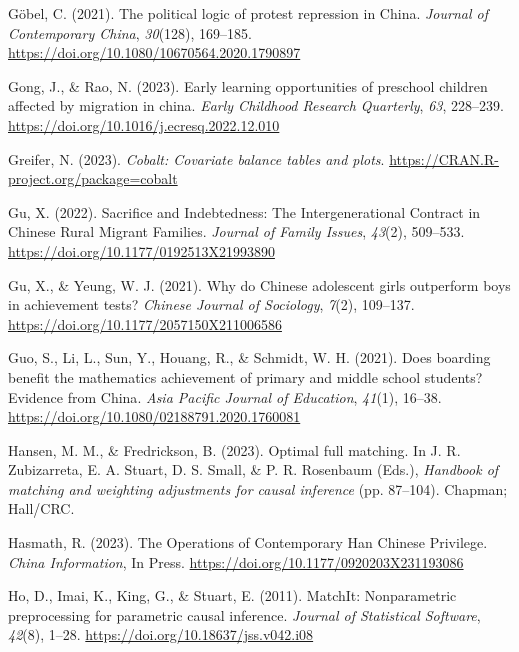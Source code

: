 \documentclass[
  man]{apa7}
\newlength{\cslhangindent}
\newlength{\cslentryspacingunit} %
\newenvironment{CSLReferences}[2] %
 {%
  \setlength{\parindent}{0pt}
  \ifodd #1
  \let\oldpar\par
  \def\par{\hangindent=\cslhangindent\oldpar}
  \fi
  \setlength{\parskip}{#2\cslentryspacingunit}
 }%
 {}
\begin{document}
\begin{CSLReferences}{1}{0}
\leavevmode{}%
Göbel, C. (2021). The political logic of protest repression in {China}. \emph{Journal of Contemporary {China}}, \emph{30}(128), 169--185. \url{https://doi.org/10.1080/10670564.2020.1790897}

\leavevmode{}%
Gong, J., \& Rao, N. (2023). Early learning opportunities of preschool children affected by migration in china. \emph{Early Childhood Research Quarterly}, \emph{63}, 228--239. \url{https://doi.org/10.1016/j.ecresq.2022.12.010}

\leavevmode{}%
Greifer, N. (2023). \emph{Cobalt: Covariate balance tables and plots}. \url{https://CRAN.R-project.org/package=cobalt}

\leavevmode{}%
Gu, X. (2022). Sacrifice and Indebtedness: The Intergenerational Contract in Chinese Rural Migrant Families. \emph{Journal of Family Issues}, \emph{43}(2), 509--533. \url{https://doi.org/10.1177/0192513X21993890}

\leavevmode{}%
Gu, X., \& Yeung, W. J. (2021). Why do {Chinese} adolescent girls outperform boys in achievement tests? \emph{Chinese Journal of Sociology}, \emph{7}(2), 109--137. \url{https://doi.org/10.1177/2057150X211006586}

\leavevmode{}%
Guo, S., Li, L., Sun, Y., Houang, R., \& Schmidt, W. H. (2021). Does boarding benefit the mathematics achievement of primary and middle school students? Evidence from {China}. \emph{Asia Pacific Journal of Education}, \emph{41}(1), 16--38. \url{https://doi.org/10.1080/02188791.2020.1760081}

\leavevmode{}%
Hansen, M. M., \& Fredrickson, B. (2023). Optimal full matching. In J. R. Zubizarreta, E. A. Stuart, D. S. Small, \& P. R. Rosenbaum (Eds.), \emph{Handbook of matching and weighting adjustments for causal inference} (pp. 87--104). Chapman; Hall/CRC.

\leavevmode{}%
Hasmath, R. (2023). The Operations of Contemporary Han Chinese Privilege. \emph{China Information}, In Press. \url{https://doi.org/10.1177/0920203X231193086}

\leavevmode{}%
Ho, D., Imai, K., King, G., \& Stuart, E. (2011). {MatchIt}: Nonparametric preprocessing for parametric causal inference. \emph{Journal of Statistical Software}, \emph{42}(8), 1--28. \url{https://doi.org/10.18637/jss.v042.i08}


\end{CSLReferences}
\end{document}
